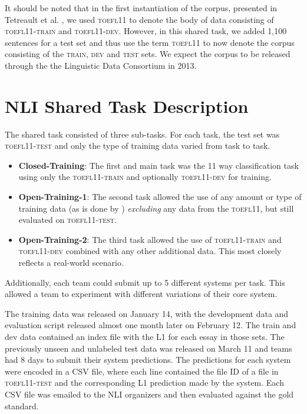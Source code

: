 \documentclass[11pt,letterpaper]{article}
\begin{document}
It should be noted that in the first instantiation of the corpus,
presented in Tetreault et al. , we used \textsc{toefl11}
to denote the body of data consisting of \textsc{toefl11-train} and \textsc{toefl11-dev}.
However, in this shared task, we added 1,100 sentences for a test
set and thus use the term \textsc{toefl11} to now denote the corpus
consisting of the \textsc{train}, \textsc{dev} and \textsc{test} sets.  We expect the corpus
to be released through the the Linguistic Data Consortium in 2013.


\section{NLI Shared Task Description}
\label{sec-shared-task-description}
The shared task consisted of three sub-tasks. For each task, the
test set was \textsc{toefl11-test} and only the type of training data varied from
task to task.

\begin{itemize}
\item {\bf Closed-Training}:  The first and main task was the 11 way
classification task using only the \textsc{toefl11-train} and optionally \textsc{toefl11-dev} for training.
\item {\bf Open-Training-1}: The second task allowed the use of any amount or
type of training data (as is done by )
\emph{excluding} any data from the \textsc{toefl11}, but still evaluated on \textsc{toefl11-test}.
\item {\bf Open-Training-2}: The third task allowed the use of \textsc{toefl11-train} and
\textsc{toefl11-dev} combined with any other additional data. This most closely reflects
a real-world scenario.
\end{itemize}

Additionally, each team could submit up to 5 different
systems per task.  This allowed a team to experiment with different
variations of their core system.

The training data was released on January 14, with the development
data and evaluation script released almost one month later on February 12.
The train and dev data contained an index file with the L1 for each
essay in those sets.  The previously unseen and unlabeled test data was
released on March 11 and teams had 8 days to submit their system predictions.
The predictions for each system
were encoded in a CSV file, where each line contained the file ID of a
file in \textsc{toefl11-test} and the corresponding L1 prediction made by the
system.  Each CSV file was emailed to the NLI organizers and then
evaluated against the gold standard.
\end{document}
